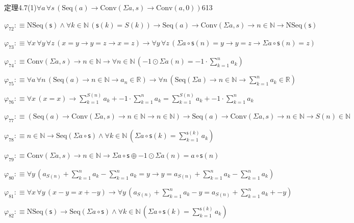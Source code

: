 \begin{fullproof}{定理4.7(1)}{$\forall a\,\forall s\,(\mathrm{Seq}(a) \to \mathrm{Conv}(\Sigma a,s) \to \mathrm{Conv}(a,0))$}{613}
\begin{abbrevlist}
\item $\varphi_{72} :\equiv \mathrm{NSeq}(\mathsf{s}) \land \forall k \in \mathbb{N}\,(\mathsf{s}(k) = S(k)) \to \mathrm{Seq}(a) \to \mathrm{Conv}(\Sigma a,s) \to n \in \mathbb{N} \to \mathrm{NSeq}(\mathsf{s})$
\item $\varphi_{73} :\equiv \forall x\,\forall y\,\forall z\,(x = y \to y = z \to x = z) \to \forall y\,\forall z\,(\Sigma a \circ \mathsf{s}(n) = y \to y = z \to \Sigma a \circ \mathsf{s}(n) = z)$
\item $\varphi_{74} :\equiv \mathrm{Conv}(\Sigma a,s) \to n \in \mathbb{N} \to \forall n \in \mathbb{N}\,(-1 \odot \Sigma a(n) = -1 \cdot {\textstyle\sum_{k=1}^{n} a_{k}})$
\item $\varphi_{75} :\equiv \forall a\,\forall n\,(\mathrm{Seq}(a) \to n \in \mathbb{N} \to a_{n} \in \mathbb{R}) \to \forall n\,(\mathrm{Seq}(\Sigma a) \to n \in \mathbb{N} \to {\textstyle\sum_{k=1}^{n} a_{k}} \in \mathbb{R})$
\item $\varphi_{76} :\equiv \forall x\,(x = x) \to {\textstyle\sum_{k=1}^{S(n)} a_{k}} + -1 \cdot {\textstyle\sum_{k=1}^{n} a_{k}} = {\textstyle\sum_{k=1}^{S(n)} a_{k}} + -1 \cdot {\textstyle\sum_{k=1}^{n} a_{k}}$
\item $\varphi_{77} :\equiv (\mathrm{Seq}(a) \to \mathrm{Conv}(\Sigma a,s) \to n \in \mathbb{N} \to n \in \mathbb{N}) \to \mathrm{Seq}(a) \to \mathrm{Conv}(\Sigma a,s) \to n \in \mathbb{N} \to S(n) \in \mathbb{N}$
\item $\varphi_{78} :\equiv n \in \mathbb{N} \to \mathrm{Seq}(\Sigma a \circ \mathsf{s}) \land \forall k \in \mathbb{N}\,(\Sigma a \circ \mathsf{s}(k) = {\textstyle\sum_{k=1}^{\mathsf{s}(k)} a_{k}})$
\item $\varphi_{79} :\equiv \mathrm{Conv}(\Sigma a,s) \to n \in \mathbb{N} \to \Sigma a \circ \mathsf{s} \oplus -1 \odot \Sigma a(n) = a \circ \mathsf{s}(n)$
\item $\varphi_{80} :\equiv \forall y\,(a_{S(n)} + {\textstyle\sum_{k=1}^{n} a_{k}} - {\textstyle\sum_{k=1}^{n} a_{k}} = y \to y = a_{S(n)} + {\textstyle\sum_{k=1}^{n} a_{k}} - {\textstyle\sum_{k=1}^{n} a_{k}})$
\item $\varphi_{81} :\equiv \forall x\,\forall y\,(x - y = x + -y) \to \forall y\,(a_{S(n)} + {\textstyle\sum_{k=1}^{n} a_{k}} - y = a_{S(n)} + {\textstyle\sum_{k=1}^{n} a_{k}} + -y)$
\item $\varphi_{82} :\equiv \mathrm{NSeq}(\mathsf{s}) \to \mathrm{Seq}(\Sigma a \circ \mathsf{s}) \land \forall k \in \mathbb{N}\,(\Sigma a \circ \mathsf{s}(k) = {\textstyle\sum_{k=1}^{\mathsf{s}(k)} a_{k}})$

\end{abbrevlist}
\end{fullproof}
